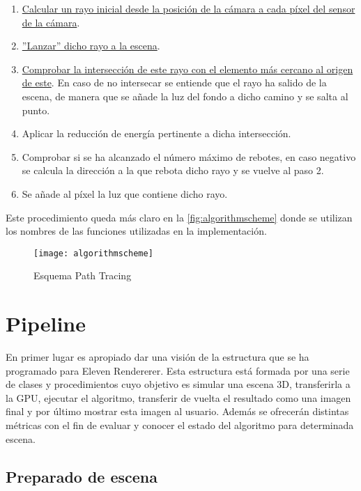 \begin{enumerate}
	\item \hyperref[sec:calculatecameraray]{Calcular un rayo inicial desde la posición de la cámara a cada píxel del sensor de la cámara}.
	\item \hyperref[sec:throwray]{''Lanzar'' dicho rayo a la escena}.
	\item \hyperref[subsec:triintersection]{Comprobar la intersección de este rayo con el elemento más cercano al origen de este}. En caso de no intersecar se entiende que el rayo ha salido de la escena, de manera que se añade la luz del fondo a dicho camino y se salta al punto.
	\item Aplicar la reducción de energía pertinente a dicha intersección.
	\item Comprobar si se ha alcanzado el número máximo de rebotes, en caso negativo se calcula la dirección a la que rebota dicho rayo y se vuelve al paso 2.
	\item Se añade al píxel la luz que contiene dicho rayo.
\end{enumerate}

Este procedimiento queda más claro en la \autoref{fig:algorithmscheme} donde se utilizan los nombres de las funciones utilizadas en la implementación.

\begin{figure}[H]
    \centering
	\texttt{[image: algorithmscheme]}
	\caption{Esquema Path Tracing}
	\label{fig:algorithmscheme}
\end{figure}



	\section{Pipeline}
		
En primer lugar es apropiado dar una visión de la estructura que se ha programado para Eleven Rendererer. Esta estructura está formada por una serie de clases y procedimientos cuyo objetivo es simular una escena 3D, transferirla a la GPU, ejecutar el algoritmo, transferir de vuelta el resultado como una imagen final y por último mostrar esta imagen al usuario. Además se ofrecerán distintas métricas con el fin de evaluar y conocer el estado del algoritmo para determinada escena.

\subsection{Preparado de escena}

